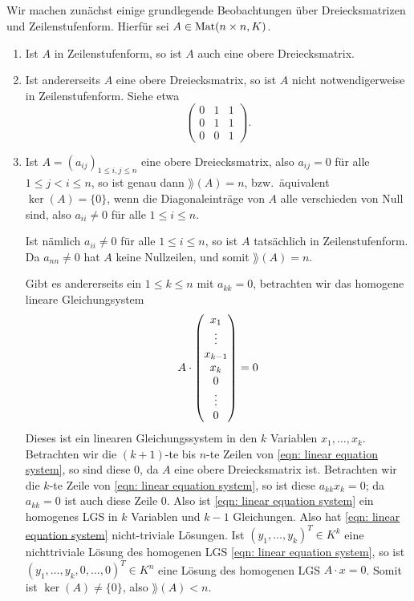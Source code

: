 \documentclass[a4paper,10pt]{scrartcl}
\begin{document}
\subsection{}
Wir machen zunächst einige grundlegende Beobachtungen über Dreiecksmatrizen und Zeilenstufenform. Hierfür sei $A \in \mathrm{Mat}(n \times n, K)$.
\begin{enumerate}
 \item
  Ist $A$ in Zeilenstufenform, so ist $A$ auch eine obere Dreiecksmatrix.
 \item
  Ist andererseits $A$ eine obere Dreiecksmatrix, so ist $A$ nicht notwendigerweise in Zeilenstufenform. Siehe etwa
  \[
   \begin{pmatrix}
    0 & 1 & 1 \\
    0 & 1 & 1 \\
    0 & 0 & 1
   \end{pmatrix}.
  \]
 \item
  Ist $A = (a_{ij})_{1 \leq i,j \leq n}$ eine obere Dreiecksmatrix, also $a_{ij} = 0$ für alle $1 \leq j < i \leq n$, so ist genau dann $\rang(A) = n$, bzw.\ äquivalent $\ker(A) = \{0\}$, wenn die Diagonaleinträge von $A$ alle verschieden von Null sind, also $a_{ii} \neq 0$ für alle $1 \leq i \leq n$.
  
  Ist nämlich $a_{ii} \neq 0$ für alle $1 \leq i \leq n$, so ist $A$ tatsächlich in Zeilenstufenform. Da $a_{nn} \neq 0$ hat $A$ keine Nullzeilen, und somit $\rang(A) = n$.
  
  Gibt es andererseits ein $1 \leq k \leq n$ mit $a_{kk} = 0$, betrachten wir das homogene lineare Gleichungsystem
  \begin{equation}\label{eqn: linear equation system}
   A \cdot \begin{pmatrix} x_1 \\ \vdots \\ x_{k-1} \\ x_k \\ 0 \\ \vdots \\ 0 \end{pmatrix} = 0
  \end{equation}
  Dieses ist ein linearen Gleichungssystem in den $k$ Variablen $x_1, \dotsc, x_k$. Betrachten wir die $(k+1)$-te bis $n$-te Zeilen von \eqref{eqn: linear equation system}, so sind diese $0$, da $A$ eine obere Dreiecksmatrix ist. Betrachten wir die $k$-te Zeile von \eqref{eqn: linear equation system}, so ist diese $a_{kk} x_k = 0$; da $a_{kk} = 0$ ist auch diese Zeile $0$. Also ist \eqref{eqn: linear equation system} ein homogenes LGS in $k$ Variablen und $k-1$ Gleichungen. Also hat \eqref{eqn: linear equation system} nicht-triviale Lösungen. Ist $(y_1, \dotsc, y_k)^T \in K^k$ eine nichttriviale Lösung des homogenen LGS \eqref{eqn: linear equation system}, so ist $(y_1, \dotsc, y_k, 0, \dotsc, 0)^T \in K^n$ eine Lösung des homogenen LGS $A \cdot x = 0$. Somit ist $\ker(A) \neq \{0\}$, also $\rang(A) < n$.
\end{enumerate}
\end{document}
